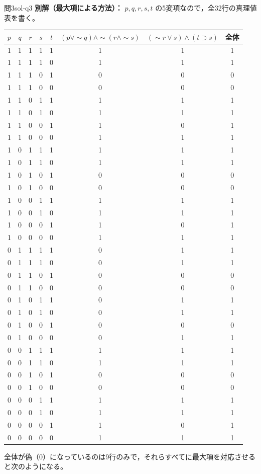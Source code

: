 \documentclass[autodetect-engine,dvi=dvipdfmx,ja=standard]{bxjsarticle}
\begin{document}
\begin{solution}{問3}{sol-q3}
\textbf{別解（最大項による方法）：} \(p,q,r,s,t\) の5変項なので，全32行の真理値表を書く。

\begin{center}
\scriptsize
\begin{longtable}{ccccc|c|c|c}
\toprule
\(p\) & \(q\) & \(r\) & \(s\) & \(t\) & \((p\lor\sim q)\land\sim(r\land\sim s)\) & \((\sim r\lor s)\land(t\supset s)\) & 全体 \\
\midrule
\endhead
1&1&1&1&1&1&1&1\\
1&1&1&1&0&1&1&1\\
1&1&1&0&1&0&0&0\\
1&1&1&0&0&0&0&0\\
1&1&0&1&1&1&1&1\\
1&1&0&1&0&1&1&1\\
1&1&0&0&1&1&0&1\\
1&1&0&0&0&1&1&1\\
1&0&1&1&1&1&1&1\\
1&0&1&1&0&1&1&1\\
1&0&1&0&1&0&0&0\\
1&0&1&0&0&0&0&0\\
1&0&0&1&1&1&1&1\\
1&0&0&1&0&1&1&1\\
1&0&0&0&1&1&0&1\\
1&0&0&0&0&1&1&1\\
0&1&1&1&1&0&1&1\\
0&1&1&1&0&0&1&1\\
0&1&1&0&1&0&0&0\\
0&1&1&0&0&0&0&0\\
0&1&0&1&1&0&1&1\\
0&1&0&1&0&0&1&1\\
0&1&0&0&1&0&0&0\\
0&1&0&0&0&0&1&1\\
0&0&1&1&1&1&1&1\\
0&0&1&1&0&1&1&1\\
0&0&1&0&1&0&0&0\\
0&0&1&0&0&0&0&0\\
0&0&0&1&1&1&1&1\\
0&0&0&1&0&1&1&1\\
0&0&0&0&1&1&0&1\\
0&0&0&0&0&1&1&1\\
\bottomrule
\end{longtable}
\end{center}

全体が偽（\(0\)）になっているのは9行のみで，それらすべてに最大項を対応させると次のようになる。


\end{solution}
\end{document}

